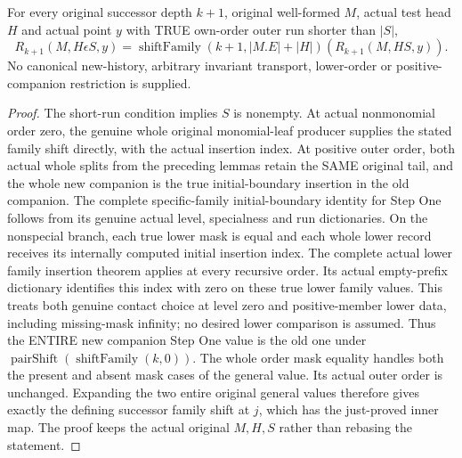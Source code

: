 \begin{theorem}
\label{hir:original-general-entire-short-family-value}
\leanok
For every original successor depth $k+1$, original well-formed $M$, actual test
head $H$ and actual point $y$ with TRUE own-order outer run shorter than $|S|$,
\[
 R_{k+1}(M,H\epsilon S,y)
  =\operatorname{shiftFamily}(k+1,|M.E|+|H|)
      (R_{k+1}(M,HS,y)).
\]
No canonical new-history, arbitrary invariant transport, lower-order or
positive-companion restriction is supplied.
\end{theorem}
\begin{proof}
The short-run condition implies $S$ is nonempty. At actual nonmonomial order
zero, the genuine whole original monomial-leaf producer supplies the stated
family shift directly, with the actual insertion index. At positive outer
order, both actual whole splits from the preceding lemmas retain the SAME
original tail, and the whole new companion is the true initial-boundary
insertion in the old companion. The complete specific-family initial-boundary
identity for Step One follows from its genuine actual level, specialness and
run dictionaries. On the nonspecial branch, each true lower mask is equal and
each whole lower record receives its internally computed initial insertion
index. The complete actual lower family insertion theorem applies at every
recursive order. Its actual empty-prefix dictionary identifies this index
with zero on these true lower family values. This treats both genuine contact
choice at level zero and positive-member lower data, including missing-mask
infinity; no desired lower comparison is assumed. Thus the ENTIRE new companion
Step One value is the old one under
$\operatorname{pairShift}(\operatorname{shiftFamily}(k,0))$.
The whole order mask equality handles both the present and absent mask cases
of the general value. Its actual outer order is unchanged. Expanding the two
entire original general values therefore gives exactly the defining successor
family shift at $j$, which has the just-proved inner map. The proof keeps the
actual original $M,H,S$ rather than rebasing the statement.
\end{proof}

